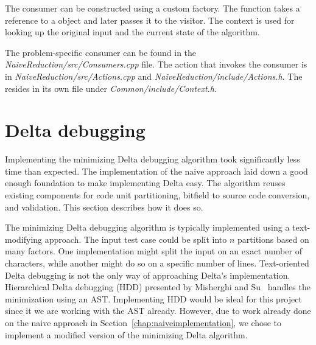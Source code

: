 The consumer can be constructed using a custom factory. 
The  function takes 
a reference to a  object and later passes it to 
the visitor. 
The context is used for looking up the original input and the current state of the algorithm.

The problem-specific consumer can be found in 
the \emph{NaiveReduction/\-src/\-Consumers.cpp} file. 
The action that invokes the consumer is 
in \emph{NaiveReduction/\-src/\-Actions.cpp} and 
\emph{NaiveReduction/\-include/\-Actions.h}. 
The  resides in its own file under 
\emph{Common/\-include/\-Context.h}.

\section{Delta debugging}\label{chap:deltaimplementation}

Implementing the minimizing Delta debugging algorithm took significantly 
less time than expected. 
The implementation of the naive approach laid down a good enough foundation 
to make implementing Delta easy. 
The algorithm reuses existing components for code unit partitioning, 
bitfield to source code conversion, and validation. 
This section describes how it does so.

The minimizing Delta debugging algorithm is typically implemented using 
a text-modifying approach. 
The input test case could be split into $n$ partitions based on many factors.
One implementation might split the input on an exact number of characters, 
while another might do so on a specific number of lines. 
Text-oriented Delta debugging is not the only way of approaching Delta's 
implementation. 
Hierarchical Delta debugging (HDD) presented by Misherghi and 
Su~\citep{Misherghi06} handles the minimization using an AST. 
Implementing HDD would be ideal for this project since it we are working 
with the AST already. 
However, due to work already done on the naive approach in 
Section~\ref{chap:naiveimplementation}, we chose to implement a modified 
version of the minimizing Delta algorithm. 

